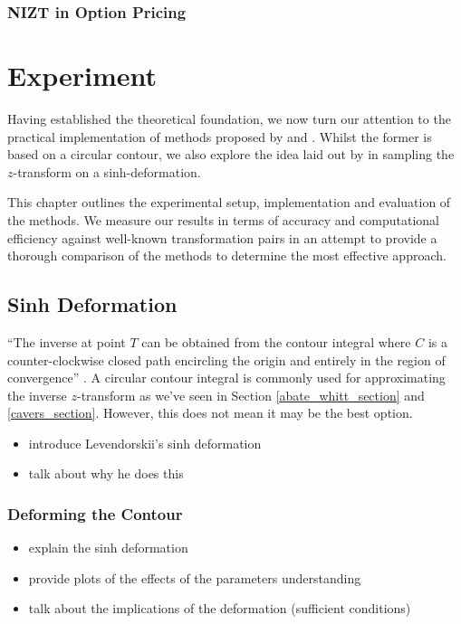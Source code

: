 \documentclass[a4paper]{report}
\begin{document}
\subsection{NIZT in Option Pricing}


\chapter{Experiment}
Having established the theoretical foundation, we now turn our attention to the practical implementation of methods proposed by \citet{AbateWhitt1992a, AbateWhitt1992b} and \citet{Cavers1978FFT}. Whilst the former is based on a circular contour, we also explore the idea laid out by \citet{levendorskii2022sinh} in sampling the $z$-transform on a sinh-deformation.

This chapter outlines the experimental setup, implementation and evaluation of the methods. We measure our results in terms of accuracy and computational efficiency against well-known transformation pairs in an attempt to provide a thorough comparison of the methods to determine the most effective approach.

\section{Sinh Deformation}
``The inverse at point $T$ can be obtained from the contour integral where $C$ is a counter-clockwise closed path encircling the origin and entirely in the region of convergence'' \citep{horvath2020numerical}. A circular contour integral is commonly used for approximating the inverse $z$-transform as we've seen in Section \ref{abate_whitt_section} and \ref{cavers_section}. However, this does not mean it may be the best option. 

\begin{itemize}
    \item introduce Levendorskii's sinh deformation
    \item talk about why he does this
\end{itemize}

\subsection{Deforming the Contour}
\begin{itemize}
    \item explain the sinh deformation
    \item provide plots of the effects of the parameters understanding
    \item talk about the implications of the deformation (sufficient conditions)
\end{itemize}
\end{document}
